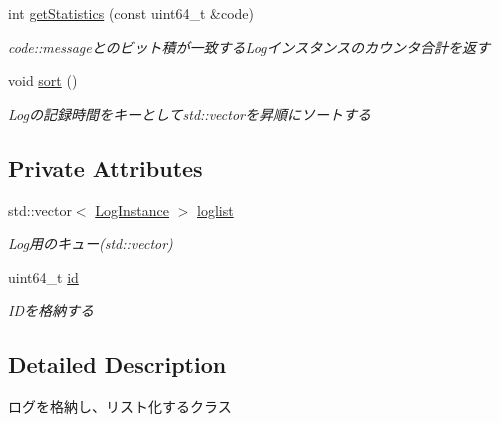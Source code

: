 \begin{DoxyCompactItemize}
\mbox{\label{class_g_a_1_1_log_queue_afcffc2b2531853f235da51dece095e47}} 
int \mbox{\hyperlink{class_g_a_1_1_log_queue_afcffc2b2531853f235da51dece095e47}{get\+Statistics}} (const uint64\+\_\+t \&code)
\begin{DoxyCompactList}\small\item\em code\+::messageとのビット積が一致する\+Logインスタンスのカウンタ合計を返す \end{DoxyCompactList}\item 
\mbox{\label{class_g_a_1_1_log_queue_a94a6016a80ecf0b926acb9fbde9cc176}} 
void \mbox{\hyperlink{class_g_a_1_1_log_queue_a94a6016a80ecf0b926acb9fbde9cc176}{sort}} ()
\begin{DoxyCompactList}\small\item\em Logの記録時間をキーとしてstd\+::vectorを昇順にソートする \end{DoxyCompactList}\end{DoxyCompactItemize}
\subsection*{Private Attributes}
\begin{DoxyCompactItemize}
\item 
\mbox{\label{class_g_a_1_1_log_queue_ac82593a2515076aec2ae29367923fd19}} 
std\+::vector$<$ \mbox{\hyperlink{class_g_a_1_1_log_instance}{Log\+Instance}} $>$ \mbox{\hyperlink{class_g_a_1_1_log_queue_ac82593a2515076aec2ae29367923fd19}{loglist}}
\begin{DoxyCompactList}\small\item\em Log用のキュー(std\+::vector) \end{DoxyCompactList}\item 
\mbox{\label{class_g_a_1_1_log_queue_a57f6f3271f69897a0e7e0f0fe93b2f0c}} 
uint64\+\_\+t \mbox{\hyperlink{class_g_a_1_1_log_queue_a57f6f3271f69897a0e7e0f0fe93b2f0c}{id}}
\begin{DoxyCompactList}\small\item\em I\+Dを格納する \end{DoxyCompactList}\end{DoxyCompactItemize}


\subsection{Detailed Description}
ログを格納し、リスト化するクラス 

